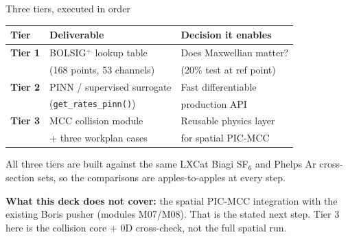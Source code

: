 \documentclass[10pt,aspectratio=169]{beamer}
\newcommand{\sfsix}{SF$_6$}
\begin{document}
\begin{frame}{Three tiers, executed in order}
  \small
  \begin{center}
  \begin{tabular}{lll}
    \toprule
    Tier & Deliverable & Decision it enables \\
    \midrule
    \textbf{Tier 1} & BOLSIG$^+$ lookup table     & Does Maxwellian matter? \\
                    & (168 points, 53 channels)    & (20\% test at ref point) \\[0.3em]
    \textbf{Tier 2} & PINN / supervised surrogate  & Fast differentiable \\
                    & (\texttt{get\_rates\_pinn()})& production API \\[0.3em]
    \textbf{Tier 3} & MCC collision module         & Reusable physics layer \\
                    & + three workplan cases       & for spatial PIC-MCC \\
    \bottomrule
  \end{tabular}
  \end{center}
  \vspace{0.5em}
  All three tiers are built against the same LXCat Biagi \sfsix{} and
  Phelps Ar cross-section sets, so the comparisons are
  apples-to-apples at every step.

  \vspace{0.5em}
  \textbf{What this deck does not cover:} the spatial PIC-MCC
  integration with the existing Boris pusher (modules M07/M08). That
  is the stated next step. Tier 3 here is the collision core + 0D
  cross-check, not the full spatial run.
\end{frame}
\end{document}
